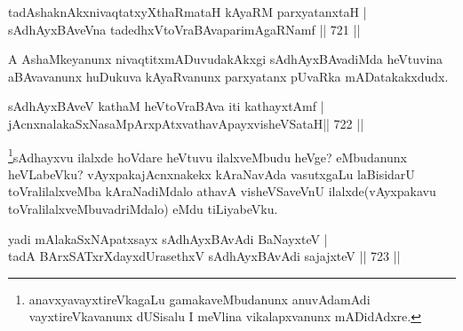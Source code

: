 \begin{shl}
tadAshaknAkxnivaqtatxyXthaRmataH kAyaRM parxyatanxtaH | \\
sAdhAyxBAveVna tadedhxVtoVraBAvaparimAgaRNamf \hfill||  721 ||  
\end{shl}

\begin{artha}
A AshaMkeyanunx nivaqtitxmADuvudakAkxgi sAdhAyxBAvadiMda heVtuvina aBAvavanunx huDukuva kAyaRvanunx parxyatanx pUvaRka mADatakakxdudx.
\end{artha}


\begin{shl}
sAdhAyxBAveV kathaM heVtoVraBAva iti kathayxtAmf | \\
\footnotemark[2]jAcnxnalakaSxNasaMpArxpAtxvathavA\s payxvisheVSataH\hfill||  722 || 
\end{shl}

\begin{artha}
\footnote{anavxyavayxtireVkagaLu gamakaveMbudanunx anuvAdamAdi vayxtireVkavanunx dUSisalu I meVlina vikalapxvanunx mADidAdxre.}sAdhayxvu ilalxde hoVdare heVtuvu ilalxveMbudu heVge? eMbudanunx heVLabeVku? vAyxpakajAcnxnakekx kAraNavAda vasutxgaLu laBisidarU toVralilalxveMba kAraNadiMdalo athavA visheVSaveVnU ilalxde(vAyxpakavu toVralilalxveMbuvadriMdalo) eMdu tiLiyabeVku.
\end{artha}


\begin{shl}
yadi mAlakaSxNApatxsayx sAdhAyxBAvAdi BaNayxteV | \\
tadA BArxSATxrXdayxdUrasethxV sAdhAyxBAvAdi sajajxteV \hfill||  723 ||  
\end{shl}

